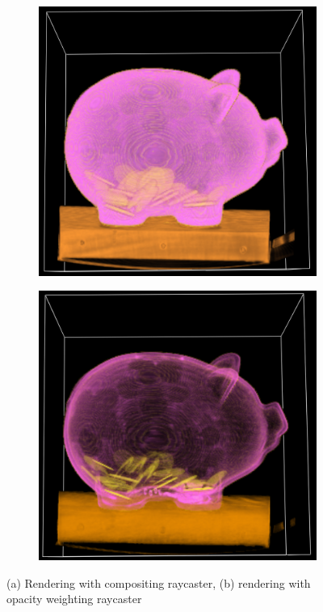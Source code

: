 \begin{figure}[h!]
    \centering
    \captionsetup{justification=centering,margin=0.5cm}
    \begin{subfigure}[t]{0.49\textwidth}
        \includegraphics[width=\textwidth]{img/pig-compositing.png}
        \caption{ }
    \end{subfigure}
    \begin{subfigure}[t]{0.49\textwidth}
        \includegraphics[width=\textwidth]{img/pig-opacity.png}
        \caption{ }
    \end{subfigure}
    \caption{(a) Rendering with compositing raycaster, (b) rendering with opacity weighting raycaster}
    \label{fig:compareraycasters}
\end{figure}


